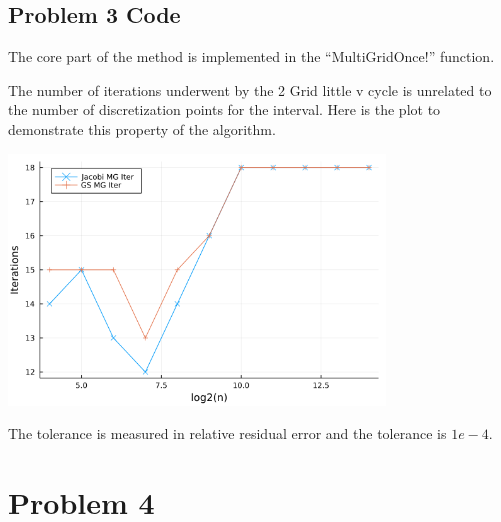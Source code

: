 \documentclass[]{article}
\begin{document}
    \subsection*{Problem 3 Code}
        
        The core part of the method is implemented in the ``MultiGridOnce!'' 
        function. 
        \par
        The number of iterations underwent by the 2 Grid little v cycle is unrelated to the number of discretization points for the interval. Here is the plot to demonstrate this property of the algorithm. 
        \begin{center}
            \includegraphics[width=10cm]{p3_mg_itr.png}
        \end{center}
        The tolerance is measured in relative residual error and the tolerance is $1e-4$. 

\section*{Problem 4}
\end{document}
